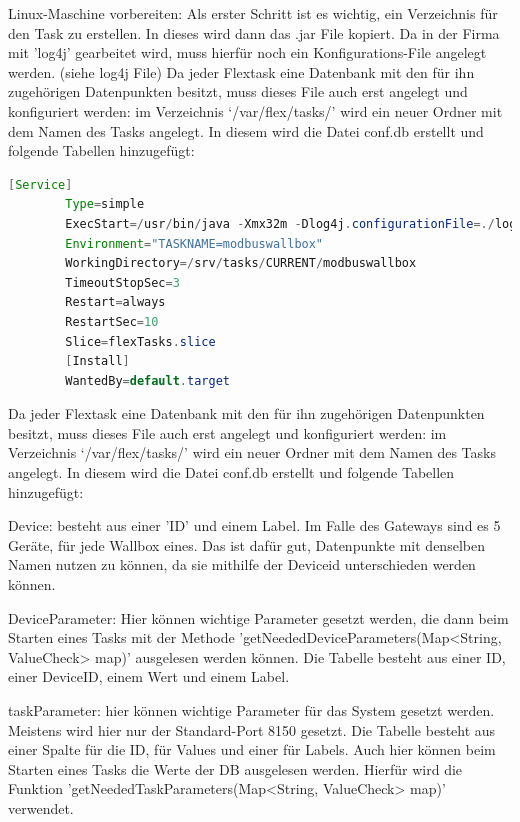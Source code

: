 \begin{compactenum}
    \item Linux-Maschine vorbereiten: Als erster Schritt ist es wichtig, ein Verzeichnis für den Task zu erstellen. In dieses wird dann das .jar File kopiert. Da in der Firma mit 'log4j' gearbeitet wird, muss hierfür noch ein Konfigurations-File angelegt werden. (siehe log4j File)
    Da jeder Flextask eine Datenbank mit den für ihn zugehörigen Datenpunkten besitzt, muss dieses File auch erst angelegt und konfiguriert werden: im Verzeichnis ‘/var/flex/tasks/’ wird ein neuer Ordner mit dem Namen des Tasks angelegt. In diesem wird die Datei conf.db erstellt und folgende Tabellen hinzugefügt:
    \begin{lstlisting}[language=java,caption=Log4J File,label=lst:impl:foo]
        [Service]
        Type=simple
        ExecStart=/usr/bin/java -Xmx32m -Dlog4j.configurationFile=./log4j2.xml -jar /srv/tasks/CURRENT/modbuswallbox/modbuswallbox.jar
        Environment="TASKNAME=modbuswallbox"
        WorkingDirectory=/srv/tasks/CURRENT/modbuswallbox
        TimeoutStopSec=3
        Restart=always
        RestartSec=10
        Slice=flexTasks.slice
        [Install]
        WantedBy=default.target
    \end{lstlisting}
    \item Da jeder Flextask eine Datenbank mit den für ihn zugehörigen Datenpunkten besitzt, muss dieses File auch erst angelegt und konfiguriert werden: im Verzeichnis ‘/var/flex/tasks/’ wird ein neuer Ordner mit dem Namen des Tasks angelegt. In diesem wird die Datei conf.db erstellt und folgende Tabellen hinzugefügt:
    \begin{compactenum}
        \item Device: besteht aus einer 'ID' und einem Label. Im Falle des Gateways sind es 5 Geräte, für jede Wallbox eines. Das ist dafür gut, Datenpunkte mit denselben Namen nutzen zu können, da sie mithilfe der Deviceid unterschieden werden können.
        \item DeviceParameter: Hier können wichtige Parameter gesetzt werden, die dann beim Starten eines Tasks mit der Methode 'getNeededDeviceParameters(Map<String, ValueCheck> map)' ausgelesen werden können. Die Tabelle besteht aus einer ID, einer DeviceID, einem Wert und einem Label.
        \item taskParameter: hier können wichtige Parameter für das System gesetzt werden. Meistens wird hier nur der Standard-Port 8150 gesetzt. Die Tabelle besteht aus einer Spalte für die ID, für Values und einer für Labels. Auch hier können beim Starten eines Tasks die Werte der DB ausgelesen werden. Hierfür wird die Funktion 'getNeededTaskParameters(Map<String, ValueCheck> map)' verwendet.

\end{compactenum}
\end{compactenum}
